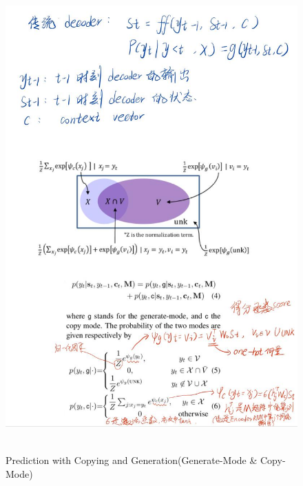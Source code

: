 \documentclass[UTF8]{ctexart}
\begin{document}
    \begin{figure}[htbp]
        \centering
        \vspace{-0.35cm} 
        \includegraphics[width=14cm,height=18cm]{pictures/p.jpg}
        \caption{Prediction with Copying and Generation(Generate-Mode \& Copy-Mode)}
    \end{figure}
\end{document}
